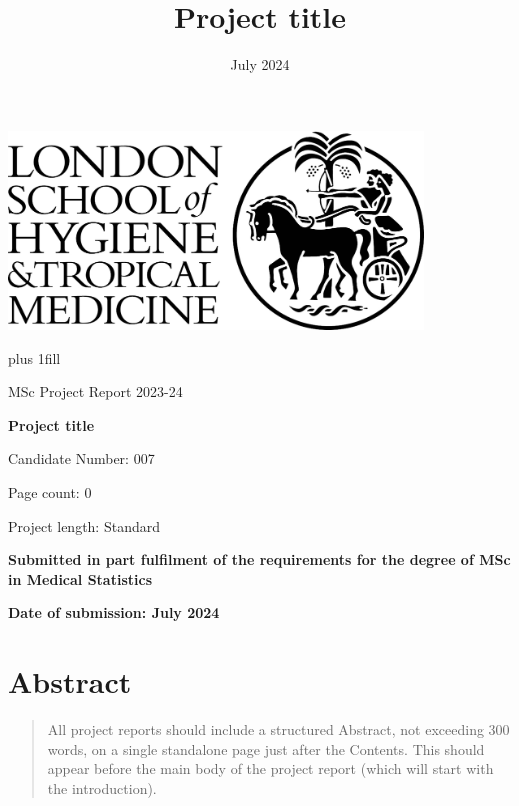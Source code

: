 \documentclass[
  11pt,
  a4paper,
]{scrreprt}
\title{Project title}
\author{}
\date{July 2024}
\renewcommand*\contentsname{Table of contents}
\newcommand\contentsname{Table of contents}
\begin{document}
\cleardoublepage
\thispagestyle{empty}
\begin{flushright}
\includegraphics[width=11cm]{img/lshtm_logo_small.jpg}
\end{flushright}
{\centering
\hbox{}\vskip 0cm plus 1fill
{\Large MSc Project Report 2023-24 \par}
\vspace{6ex}
{\Huge\bfseries Project title \par}
\vspace{6ex}
{\Large Candidate Number: 007 \par}
\vspace{12ex}
{\small Page count:  0 \par}
\vspace{3ex}
{\small Project length: Standard \par}
\vspace{6ex}
{\bfseries\large Submitted in part fulfilment of the requirements for the degree of MSc in Medical
Statistics \par}
\vspace{3ex}
{\bfseries\large Date of submission:  July 2024 \par}
\vspace{12ex}
}
\let\mainmatterreal\mainmatter
\let\mainmatter\relax
\renewcommand*\contentsname{Table of contents}
{
\hypersetup{linkcolor=}
\setcounter{tocdepth}{1}
\tableofcontents
}

\chapter*{Abstract}\label{abstract}


\begin{quote}
All project reports should include a structured Abstract, not exceeding
300 words, on a single standalone page just after the Contents. This
should appear before the main body of the project report (which will
start with the introduction).
\end{quote}
\end{document}
